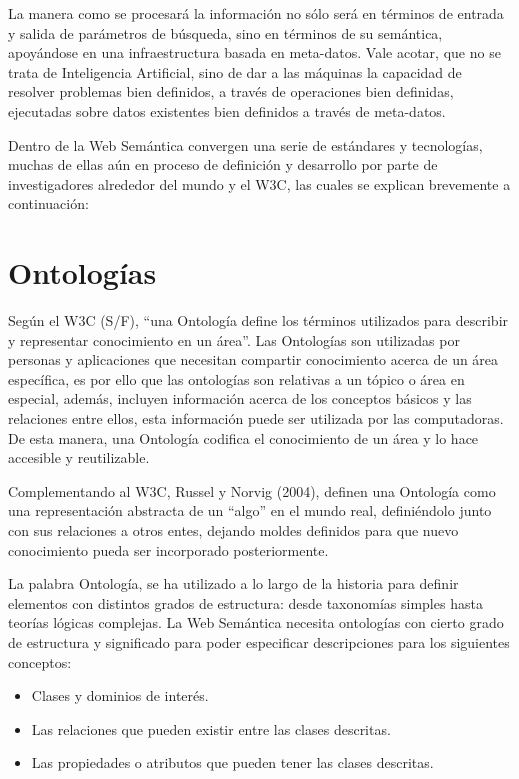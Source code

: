 La manera como se procesará la información no sólo será en términos de entrada y salida de parámetros de búsqueda, sino en términos de su semántica, apoyándose en una infraestructura basada en meta-datos. Vale acotar, que no se trata de Inteligencia Artificial, sino de dar a las máquinas la capacidad de resolver problemas bien definidos, a través de operaciones bien definidas, ejecutadas sobre datos existentes bien definidos a través de meta-datos.

Dentro de la Web Semántica convergen una serie de estándares y tecnologías, muchas de ellas aún en proceso de definición y desarrollo por parte de investigadores alrededor del mundo y el W3C, las cuales se explican brevemente a continuación:

\section{Ontologías}

Según el W3C (S/F), ``una Ontología define los términos utilizados para describir y representar conocimiento en un área''. Las Ontologías son utilizadas por personas y aplicaciones que necesitan compartir conocimiento acerca de un área específica, es por ello que las ontologías son relativas a un tópico o área en especial, además, incluyen información acerca de los conceptos básicos y las relaciones entre ellos, esta información puede ser utilizada por las computadoras. De esta manera, una Ontología codifica el conocimiento de un área y lo hace accesible y reutilizable.

Complementando al W3C, Russel y Norvig (2004), definen una Ontología como una representación abstracta de un ``algo'' en el mundo real, definiéndolo junto con sus relaciones a otros entes, dejando moldes definidos para que nuevo conocimiento pueda ser incorporado posteriormente.

La palabra Ontología, se ha utilizado a lo largo de la historia para definir elementos con distintos grados de estructura: desde taxonomías simples hasta teorías lógicas complejas. La Web Semántica necesita ontologías con cierto grado de estructura y significado para poder especificar descripciones para los siguientes conceptos:

\begin{itemize}
\item Clases y dominios de interés.
\item Las relaciones que pueden existir entre las clases descritas.
\item Las propiedades o atributos que pueden tener las clases descritas.
\end{itemize}

